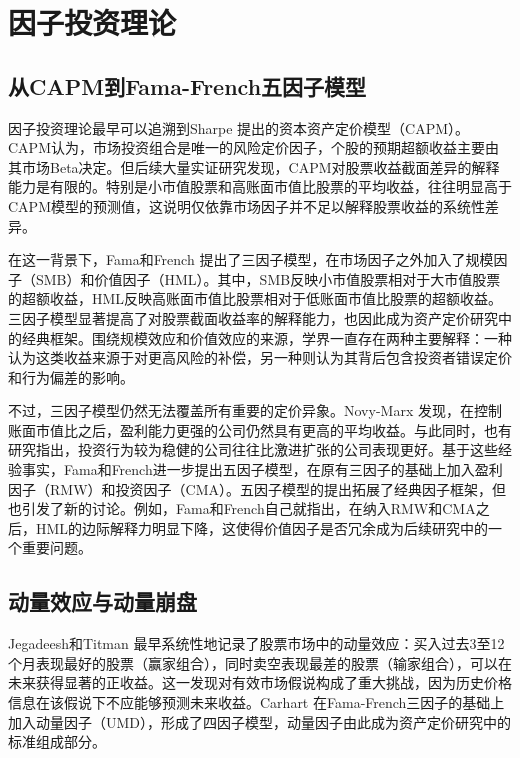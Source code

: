 \documentclass[
    decl-page,
    oneside,
  ]{njuthesis}
\begin{document}
\section{因子投资理论}

\subsection{从CAPM到Fama-French五因子模型}

因子投资理论最早可以追溯到Sharpe \cite{sharpe1964capital} 提出的资本资产定价模型（CAPM）。CAPM认为，市场投资组合是唯一的风险定价因子，个股的预期超额收益主要由其市场Beta决定。但后续大量实证研究发现，CAPM对股票收益截面差异的解释能力是有限的。特别是小市值股票和高账面市值比股票的平均收益，往往明显高于CAPM模型的预测值，这说明仅依靠市场因子并不足以解释股票收益的系统性差异。

在这一背景下，Fama和French \cite{fama1993common} 提出了三因子模型，在市场因子之外加入了规模因子（SMB）和价值因子（HML）。其中，SMB反映小市值股票相对于大市值股票的超额收益，HML反映高账面市值比股票相对于低账面市值比股票的超额收益。三因子模型显著提高了对股票截面收益率的解释能力，也因此成为资产定价研究中的经典框架。围绕规模效应和价值效应的来源，学界一直存在两种主要解释：一种认为这类收益来源于对更高风险的补偿，另一种则认为其背后包含投资者错误定价和行为偏差的影响。

不过，三因子模型仍然无法覆盖所有重要的定价异象。Novy-Marx \cite{novymarx2013other}发现，在控制账面市值比之后，盈利能力更强的公司仍然具有更高的平均收益。与此同时，也有研究指出，投资行为较为稳健的公司往往比激进扩张的公司表现更好。基于这些经验事实，Fama和French进一步提出五因子模型，在原有三因子的基础上加入盈利因子（RMW）和投资因子（CMA）。五因子模型的提出拓展了经典因子框架，但也引发了新的讨论。例如，Fama和French自己就指出，在纳入RMW和CMA之后，HML的边际解释力明显下降，这使得价值因子是否冗余成为后续研究中的一个重要问题。

\subsection{动量效应与动量崩盘}

Jegadeesh和Titman \cite{jegadeesh1993returns} 最早系统性地记录了股票市场中的动量效应：买入过去3至12个月表现最好的股票（赢家组合），同时卖空表现最差的股票（输家组合），可以在未来获得显著的正收益。这一发现对有效市场假说构成了重大挑战，因为历史价格信息在该假说下不应能够预测未来收益。Carhart \cite{carhart1997persistence} 在Fama-French三因子的基础上加入动量因子（UMD），形成了四因子模型，动量因子由此成为资产定价研究中的标准组成部分。
\end{document}
